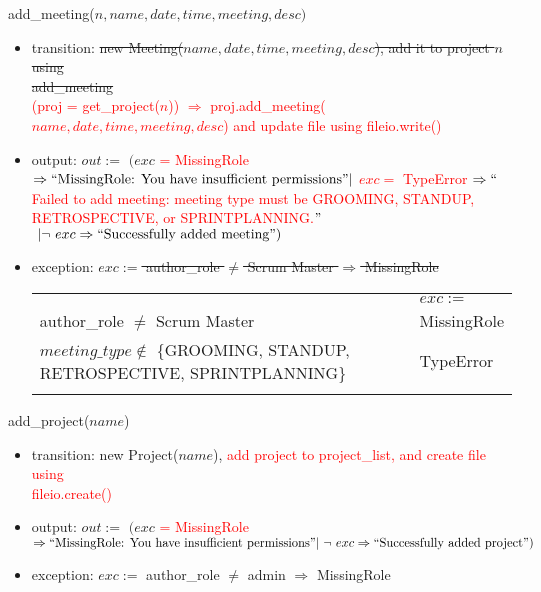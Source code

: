 \documentclass[12pt, titlepage]{article}
\begin{document}
\noindent add\_meeting($n, name, date, time, meeting, desc)$
\begin{itemize}
    \item transition: \sout{new Meeting($name, date, time, meeting, desc$), add it to project $n$ using\\ add\_meeting}\\
    \textcolor{red}{(proj = get\_project($n$)) $\Rightarrow$ proj.add\_meeting($name, date, time, meeting, desc$) and update file using fileio.write()}
    
    \item output: $out :=$ $(exc$ \textcolor{red}{= MissingRole} $\Rightarrow ``\text{MissingRole: You have insufficient permissions}"\\ |$ \textcolor{red}{$exc =$ TypeError $\Rightarrow ``$Failed to add meeting: meeting type must be GROOMING, STANDUP, RETROSPECTIVE, or SPRINTPLANNING.$"$}$\ |\ \\ \lnot\ exc \Rightarrow ``\text{Successfully added meeting}")$
    
    \item exception: \sout{$exc :=$ author\_role $\neq$ Scrum Master $\Rightarrow$ MissingRole}\\
    \textcolor{red}{
    \begin{tabular}{|p{12cm}|l|}
        \hhline{~|-|}
        \multicolumn{1}{r|}{} & \multicolumn{1}{l|}{$exc :=$}\\
        \hhline{|-|-|}
        author\_role $\neq$ Scrum Master & MissingRole\\
        \hhline{|-|-|}
        $meeting\_type \notin$ \{GROOMING, STANDUP, RETROSPECTIVE, SPRINTPLANNING\} & TypeError\\
        \hhline{|-|-|}
    \end{tabular}}
\end{itemize}

\noindent add\_project($name$)
\begin{itemize}
    \item transition: new Project($name$), \textcolor{red}{add project to project\_list, and create file using\\ fileio.create()}
    \item output: $out :=$ $(exc$ \textcolor{red}{= MissingRole} $\Rightarrow ``\text{MissingRole: You have insufficient permissions}"\\ |\ \lnot\ exc \Rightarrow ``\text{Successfully added project}")$
    \item exception: $exc :=$ author\_role $\neq$ admin $\Rightarrow$ MissingRole
\end{itemize}
\end{document}
